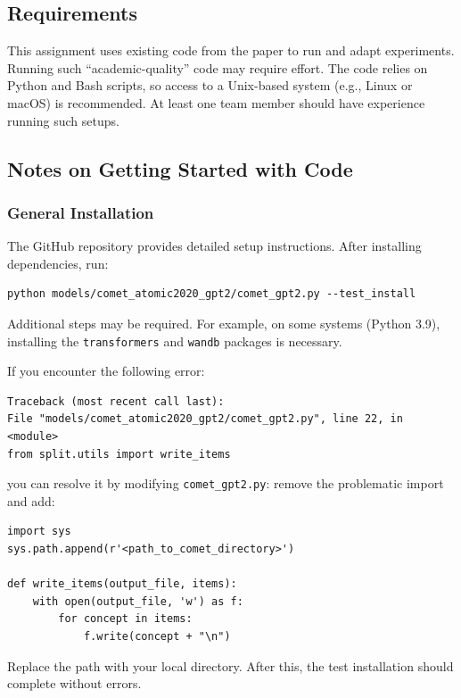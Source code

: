 \documentclass[11pt,a4paper]{article}
\begin{document}
\subsection{Requirements}

This assignment uses existing code from the paper to run and adapt experiments. Running such ``academic-quality'' code may require effort. The code relies on Python and Bash scripts, so access to a Unix-based system (e.g., Linux or macOS) is recommended. At least one team member should have experience running such setups.

\subsection{Notes on Getting Started with Code}

\subsubsection*{General Installation}

The GitHub repository provides detailed setup instructions. After installing dependencies, run:

\begin{verbatim}
python models/comet_atomic2020_gpt2/comet_gpt2.py --test_install
\end{verbatim}

Additional steps may be required. For example, on some systems (Python 3.9), installing the \texttt{transformers} and \texttt{wandb} packages is necessary.

If you encounter the following error:

\begin{verbatim}
Traceback (most recent call last):
File "models/comet_atomic2020_gpt2/comet_gpt2.py", line 22, in <module>
from split.utils import write_items
\end{verbatim}

you can resolve it by modifying \texttt{comet\_gpt2.py}: remove the problematic import and add:

\begin{verbatim}
import sys
sys.path.append(r'<path_to_comet_directory>')

def write_items(output_file, items):
    with open(output_file, 'w') as f:
        for concept in items:
            f.write(concept + "\n")
\end{verbatim}

Replace the path with your local directory. After this, the test installation should complete without errors.
\end{document}
